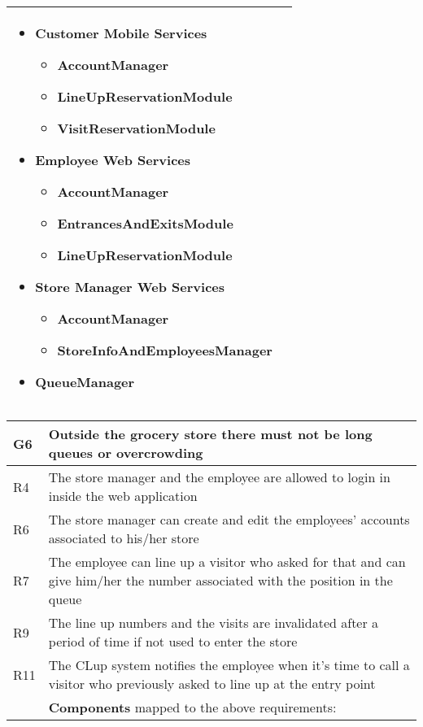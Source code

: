 \begin{center}
{\begin{longtable}{L{2.5cm}L{12cm}}
        \medskip 
        \begin{itemize}
            \item Customer Mobile Services \begin{itemize}
                \item AccountManager
                \item LineUpReservationModule
                \item VisitReservationModule
            \end{itemize}
            \item Employee Web Services \begin{itemize}
                \item AccountManager
                \item EntrancesAndExitsModule
                \item LineUpReservationModule
            \end{itemize}
            \item Store Manager Web Services \begin{itemize}
                \item AccountManager
                \item StoreInfoAndEmployeesManager
            \end{itemize}
            \item QueueManager
        \end{itemize} \\
        \hline
    \end{longtable}}

    {\renewcommand{\arraystretch}{1.5}
    \begin{longtable}{L{2.5cm}L{12cm}}
        \hline
        \textbf{G6} & \textbf{Outside the grocery store there must not be long queues or overcrowding} \\
        \hline
         R4 & The store manager and the employee are allowed to login in inside the web application \\
        \hline
         R6 & The store manager can create and edit the employees’ accounts associated to his/her store \\
        \hline
         R7 & The employee can line up a visitor who asked for that and can give him/her the number associated with the position in the queue \\
        \hline
         R9 & The line up numbers and the visits are invalidated after a period of time if not used to enter the store \\
        \hline
         R11 & The CLup system notifies the employee when it’s time to call a visitor who previously asked to line up at the entry point \\
        \hline
         & \textbf{Components} mapped to the above requirements:


\end{longtable}}
\end{center}
